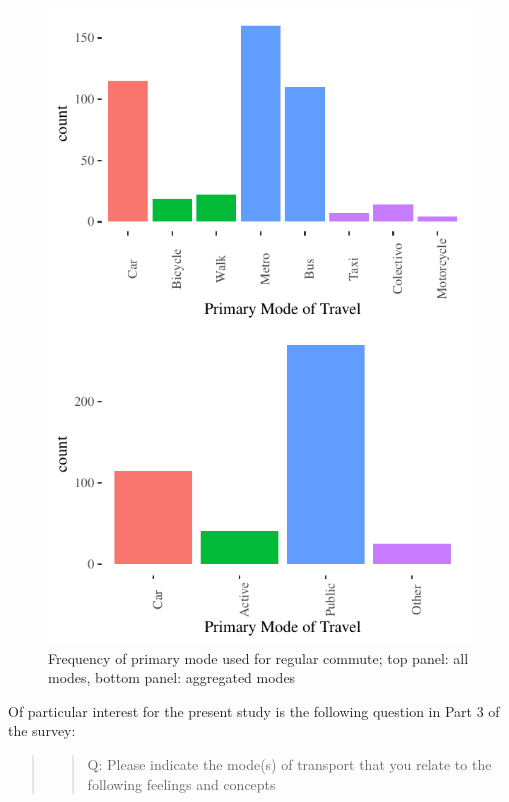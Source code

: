 \documentclass[]{elsarticle} %
\makeatletter
\def\maxwidth{\ifdim\Gin@nat@width>\linewidth\linewidth
\else\Gin@nat@width\fi}
\let\Oldincludegraphics\includegraphics
\renewcommand{\includegraphics}[1]{\Oldincludegraphics[width=\maxwidth]{#1}}
\makeatother
\begin{document}
\begin{figure}
\centering
\includegraphics{Dissonance_Santiago_v2_files/figure-latex/figure-primary-mode-travel-1.pdf}
\caption{\label{fig:primary-mode-travel}Frequency of primary mode used
for regular commute; top panel: all modes, bottom panel: aggregated
modes}
\end{figure}

Of particular interest for the present study is the following question
in Part 3 of the survey:

\begin{quote}
\begin{quote}
Q: Please indicate the mode(s) of transport that you relate to the
following feelings and concepts
\end{quote}
\end{quote}
\end{document}
